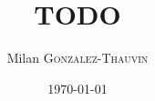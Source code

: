 
\def\tocsection{1}    		%








%


\title[TODO]{TODO}
\author{Milan \textsc{Gonzalez-Thauvin}}
\date{\today} %



\begin{frame}
	\titlepage{}
\end{frame}






